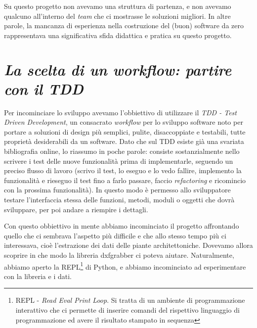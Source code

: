 \documentclass[12pt]{report}
\begin{document}
Su questo progetto non avevamo una struttura di partenza, e non
avevamo qualcuno all'interno del \textit{team} che ci mostrasse le
soluzioni migliori. In altre parole, la mancanza di esperienza nella
costruzione del (buon) software da zero rappresentava una significativa sfida
didattica e pratica su questo progetto.

\section{\textit{La scelta di un \textit{workflow}: partire con il TDD}}

Per incominciare lo sviluppo avevamo l'obbiettivo di utilizzare il
\textit{TDD - Test Driven Development}, un consacrato \textit{workflow} per lo
sviluppo software noto per portare a soluzioni di design più semplici, pulite,
disaccoppiate e testabili, tutte proprietà desiderabili da un software. Dato
che sul TDD esiste già una svariata bibliografia online, lo riassumo in poche
parole: consiste sostanzialmente nello scrivere i test delle nuove
funzionalità prima di implementarle, seguendo un preciso flusso di lavoro
(scrivo il test, lo eseguo e lo vedo fallire, implemento la funzionalità e
rieseguo il test fino a farlo passare, faccio \textit{refactoring} e
ricomincio con la prossima funzionalità). In questo modo è permesso allo
sviluppatore testare l'interfaccia stessa delle funzioni, metodi, moduli o
oggetti che dovrà sviluppare, per poi andare a riempire i dettagli.

Con questo obbiettivo in mente abbiamo incominciato il progetto
affrontando quello che ci sembrava l'aspetto più difficile e che allo
stesso tempo più ci interessava, cioè l'estrazione dei dati delle
piante architettoniche. Dovevamo allora scoprire in che modo la
libreria dxfgrabber ci poteva aiutare. Naturalmente, abbiamo
aperto la REPL\footnote{

  REPL - \textit{Read Eval Print Loop}. Si tratta di un ambiente di
programmazione interattivo che ci permette di inserire comandi del
rispettivo linguaggio di programmazione ed avere il risultato
stampato in sequenza 
} 
di Python, e abbiamo incominciato ad esperimentare con la libreria e i dati.
\end{document}
